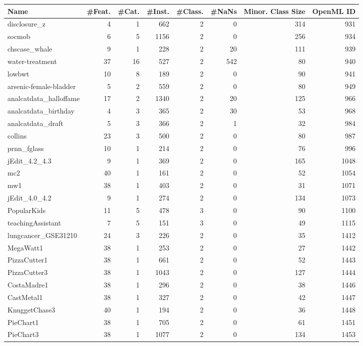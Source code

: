\begin{tabular}{@{\hskip 0mm}l@{\hskip 0mm}rrrrrrr}
\toprule
 Name & \#Feat. &  \#Cat. &  \#Inst. &  \#Class. &  \#NaNs &  Minor. Class Size & OpenML ID \\
\midrule
 disclosure\_z & 4 & 1 & 662 & 2 & 0 & 314 & 931 \\
 socmob & 6 & 5 & 1156 & 2 & 0 & 256 & 934 \\
 chscase\_whale & 9 & 1 & 228 & 2 & 20 & 111 & 939 \\
 water-treatment & 37 & 16 & 527 & 2 & 542 & 80 & 940 \\
 lowbwt & 10 & 8 & 189 & 2 & 0 & 90 & 941 \\
 arsenic-female-bladder & 5 & 2 & 559 & 2 & 0 & 80 & 949 \\
 analcatdata\_halloffame & 17 & 2 & 1340 & 2 & 20 & 125 & 966 \\
 analcatdata\_birthday & 4 & 3 & 365 & 2 & 30 & 53 & 968 \\
 analcatdata\_draft & 5 & 3 & 366 & 2 & 1 & 32 & 984 \\
 collins & 23 & 3 & 500 & 2 & 0 & 80 & 987 \\
 prnn\_fglass & 10 & 1 & 214 & 2 & 0 & 76 & 996 \\
 jEdit\_4.2\_4.3 & 9 & 1 & 369 & 2 & 0 & 165 & 1048 \\
 mc2 & 40 & 1 & 161 & 2 & 0 & 52 & 1054 \\
 mw1 & 38 & 1 & 403 & 2 & 0 & 31 & 1071 \\
 jEdit\_4.0\_4.2 & 9 & 1 & 274 & 2 & 0 & 134 & 1073 \\
 PopularKids & 11 & 5 & 478 & 3 & 0 & 90 & 1100 \\
 teachingAssistant & 7 & 5 & 151 & 3 & 0 & 49 & 1115 \\
 lungcancer\_GSE31210 & 24 & 3 & 226 & 2 & 0 & 35 & 1412 \\
 MegaWatt1 & 38 & 1 & 253 & 2 & 0 & 27 & 1442 \\
 PizzaCutter1 & 38 & 1 & 661 & 2 & 0 & 52 & 1443 \\
 PizzaCutter3 & 38 & 1 & 1043 & 2 & 0 & 127 & 1444 \\
 CostaMadre1 & 38 & 1 & 296 & 2 & 0 & 38 & 1446 \\
 CastMetal1 & 38 & 1 & 327 & 2 & 0 & 42 & 1447 \\
 KnuggetChase3 & 40 & 1 & 194 & 2 & 0 & 36 & 1448 \\
 PieChart1 & 38 & 1 & 705 & 2 & 0 & 61 & 1451 \\
 PieChart3 & 38 & 1 & 1077 & 2 & 0 & 134 & 1453 \\

\end{tabular}
